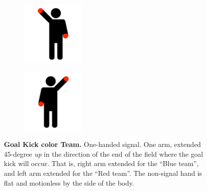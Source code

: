         \begin{figure}[ht!]
            \centering
            \begin{subfigure}{.33\textwidth}
                \includegraphics[height=120px]{figs/referee-signals/goal-kick.png}
            \end{subfigure}
            \begin{subfigure}{.33\textwidth}
                \includegraphics[height=120px]{figs/referee-signals/goal-kick-flipped.png}
            \end{subfigure}
            \caption{\textbf{Goal Kick \textlangle{}color\textrangle{} Team.}
            One-handed signal. One arm, extended 45-degree \emph{up} in the direction of the end of the field where the goal kick will occur. That is, right arm extended for the ``Blue team'', and left arm extended for the ``Red team''. The non-signal hand is flat and motionless by the side of the body.}
        \end{figure}

